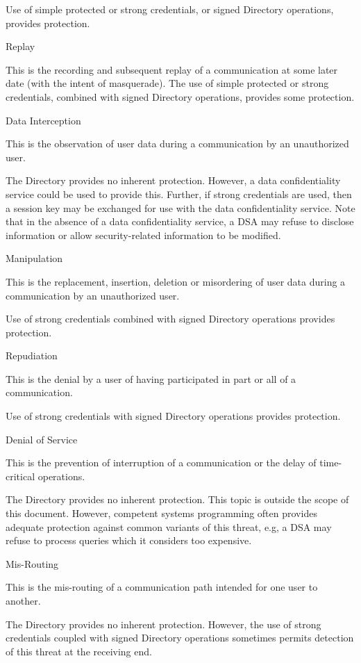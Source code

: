 Use of simple protected or strong credentials, or signed Directory operations, 
provides protection.


\m Replay


This is the recording and subsequent replay of a communication at some later date
(with the intent of masquerade). The use of simple protected or strong credentials,
combined with signed Directory operations, provides some protection.

 
\m Data Interception


This is the observation of user data during a communication by an unauthorized user.

The Directory provides no inherent protection. However, a data confidentiality 
service could be used to provide this. Further, if strong credentials are used, then
a session key may be exchanged for use with the data confidentiality service. Note
that in the absence of a data confidentiality service, a DSA may refuse to disclose
information or allow security-related information to be modified.


\m Manipulation


This is the replacement, insertion, deletion or misordering of user data during a
communication by an unauthorized user.

Use of strong credentials combined with signed Directory operations provides protection.


\m Repudiation

This is the denial by a user of having participated in part or all of a
communication.

Use of strong credentials with signed Directory operations provides protection.


\m Denial of Service

This is the prevention of interruption of a communication or the delay of
time-critical operations. 

The Directory provides no inherent protection. This topic is outside the scope
of this document. However, competent systems programming often provides adequate
protection against common variants of this threat, e.g, a DSA may refuse
to process queries which it considers too expensive.


\m Mis-Routing


This is the mis-routing of a communication path intended for one user to another.

The Directory provides no inherent protection. However, the use of strong
credentials coupled with signed Directory operations sometimes permits detection
of this threat at the receiving end.


